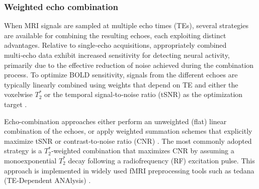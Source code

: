 \subsubsection{Weighted echo combination}



When MRI signals are sampled at multiple echo times (TEs), several strategies are available for combining the resulting echoes, each exploiting distinct advantages. Relative to single‑echo acquisitions, appropriately combined multi‑echo data exhibit increased sensitivity for detecting neural activity, primarily due to the effective reduction of noise achieved during the combination process. To optimize BOLD sensitivity, signals from the different echoes are typically linearly combined using weights that depend on TE and either the voxelwise $T_2^*$ or the temporal signal‑to‑noise ratio (tSNR) as the optimization target \citep{liuGeometricViewSignal2022a}.

Echo-combination approaches either perform an unweighted (flat) linear combination of the echoes, or apply weighted summation schemes that explicitly maximize tSNR or contrast‑to‑noise ratio (CNR) \citep{kundu2017multi,liuGeometricViewSignal2022a}. The most commonly adopted strategy is a $T_2^*$‑weighted combination that maximizes CNR by assuming a monoexponential $T_2^*$ decay following a radiofrequency (RF) excitation pulse. This approach is implemented in widely used fMRI preprocessing tools such as tedana (TE‑Dependent ANAlysis) \citep{dupre2021te,kundu2012differentiating}.

